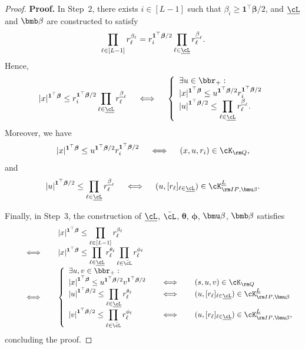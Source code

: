 \documentclass[opre, blindrev]{informs4}
\newcommand{\1}[1]{\mathds{1}{\left(#1\right)}}
\begin{document}
\begin{appendices}
\begin{proof}{\bf Proof.}
In Step~$2$, there exists $i \in [L-1]$ such that $\beta_i \geq \bm 1^\top \bm \beta/2$, and $\underline \cL$ and $\bmb \beta$ are constructed to satisfy 
$$
\prod_{\ell \in [L-1]} r^{\beta_\ell}_\ell  = r_i^{\bm 1^\top \bm \beta/2}\prod_{\ell \in \underline \cL} r^{\underline \beta_\ell}_\ell.
$$
Hence,
$$
|x|^{\bm 1^\top \bm \beta} \leq r_i^{\bm 1^\top \bm \beta/2}\prod_{\ell \in \underline \cL} r^{\underline \beta_\ell}_\ell 
~~~\iff~~~
\left\{
\begin{array}{l}
\exists u \in \bbr_+:\\
\displaystyle |x|^{\bm 1^\top \bm \beta} \leq {u}^{\bm 1^\top \bm \beta/2} r_i^{\bm 1^\top \bm \beta/2}\\
\displaystyle {|u|}^{\bm 1^\top \bm \beta/2} \leq  \prod_{\ell \in \underline \cL}r_\ell^{\underline \beta_\ell}.
\end{array}
\right.
$$
Moreover,  we have
$$
|x|^{\bm 1^\top \bm \beta} \leq {u}^{\bm 1^\top \bm \beta/2} r_i^{\bm 1^\top \bm \beta/2} 
~~~\iff~~~
(x,u,r_i) \in \cK_{\rm Q},
$$
and 
$$
{|u|}^{\bm 1^\top \bm \beta/2} \leq  \prod_{\ell \in \underline \cL}r_\ell^{\underline \beta_\ell} 
~~~\iff~~~
(u, [r_\ell]_{\ell \in \underline \cL}) \in \cK^{\underline L}_{{\rm IP},\bmu \beta}.
$$

Finally, in Step~$3$, the construction of $\underline \cL$, $\bar \cL$, $\bm \theta$, $\bm \phi$, $\bmu \beta$, $\bmb \beta$ satisfies
$$
\begin{array}{rcl}
&& \displaystyle |x|^{\bm 1^\top \bm \beta} \leq  \prod_{\ell \in [L-1]}r_\ell^{\beta_\ell} \\
&~~~\iff~~~& \displaystyle  
|x|^{\bm 1^\top \bm \beta}  \leq \prod_{\ell \in \underline \cL}r_\ell^{\theta_\ell}\prod_{\ell \in \bar \cL}r_\ell^{\phi_\ell}\\
&~~~\iff~~~&
\left\{
\begin{array}{lcl}
\exists u,v \in \bbr_+:\\
\displaystyle {|x|}^{\bm 1^\top \bm \beta} \leq {u}^{\bm 1^\top \bm \beta/2} {v}^{\bm 1^\top \bm \beta/2} &~~~\iff~~~& (s,u,v) \in \cK_{\rm Q}\\
\displaystyle {|u|}^{\bm 1^\top \bm \beta/2} \leq  \prod_{\ell \in \underline \cL}r_\ell^{\theta_\ell} &~~~\iff~~~& (u, [r_\ell]_{\ell \in \underline \cL}) \in \cK^{\underline L}_{{\rm IP},\bmu \beta} \\
\displaystyle  {|v|}^{\bm 1^\top \bm \beta/2} \leq  \prod_{\ell \in \bar \cL}r_\ell^{\phi_\ell} &~~~\iff~~~& (u, [r_\ell]_{\ell \in \underline \cL}) \in \cK^{\underline L}_{{\rm IP},\bmu \beta},
\end{array}\right.
\end{array}
$$
concluding the proof.
\hfill \Halmos
\end{proof}


\end{appendices}
\end{document}
